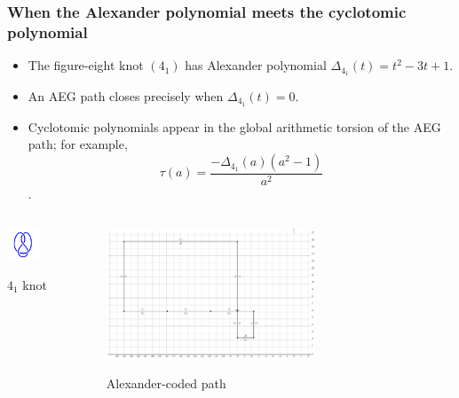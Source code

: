 \documentclass[aspectratio=169]{beamer}
\begin{document}
\begin{frame}
    \frametitle{When the Alexander polynomial meets the cyclotomic polynomial}
    \begin{itemize}
        \item The figure-eight knot $(4_1)$ has Alexander polynomial $\Delta_{4_1}(t)=t^2-3t+1$.
        \item An AEG path closes precisely when $\Delta_{4_1}(t)=0$.
        \item Cyclotomic polynomials appear in the global arithmetic torsion of the AEG path; for example, $$\tau(a) = \frac{-\Delta_{4_1}(a)(a^2-1)}{a^2}$$.
    \end{itemize}
    \vspace{0.2cm}
    \begin{columns}
        \begin{column}{0.48\textwidth}
            \begin{center}
                \includegraphics[width=0.4\textwidth]{../images/knot_4_1}

                {\small $4_1$ knot}
            \end{center}
        \end{column}
        \begin{column}{0.48\textwidth}
            \begin{center}
                \includegraphics[width=0.6\textwidth]{../images/alexander_4_1}
                
                {\small Alexander-coded path}
            \end{center}
        \end{column}
    \end{columns}
\end{frame}
\end{document}
